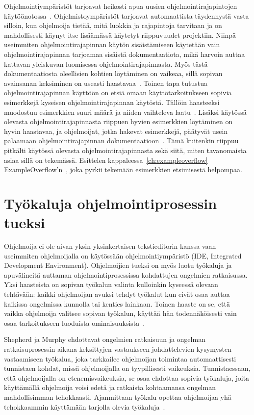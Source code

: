 \documentclass[finnish]{tktltiki2}
\theoremstyle{definition}
\theoremstyle{remark}
\begin{document}
Ohjelmointiympäristöt tarjoavat heikosti apua uusien ohjelmointirajapintojen käytöönotossa~\cite{jungloid-mining}. Ohjelmistoympäristöt tarjoavat automaattista täydennystä vasta silloin, kun ohjelmoija tietää, mitä luokkia ja rajapintoja tarvitaan ja on mahdollisesti käynyt itse lisäämässä käytetyt riippuvuudet projektiin. Niinpä useimmiten ohjelmointirajapinnan käytön sisäistämiseen käytetään vain ohjelmointirajapinnan tarjoamaa sisäistä dokumentaatiota, mikä harvoin auttaa kattavan yleiskuvan luomisessa ohjelmointirajapinnasta. Myös tästä dokumentaatiosta oleellisien kohtien löytäminen on vaikeaa, sillä sopivan avainsanan keksiminen on useasti haastavaa~\cite{what-to-search-for}.
Toinen tapa tutustua ohjelmointirajapinnan käyttöön on etsiä omaan käyttötarkoitukseen sopivia esimerkkejä kyseisen ohjelmointirajapinnan käytöstä. Tällöin haasteeksi muodostuu esimerkkien suuri määrä ja niiden vaihteleva laatu~\cite{example-overflow-social-media-for-code-recommendations}. Lisäksi käytössä olevasta ohjelmointirajapinnasta riippuen hyvien esimerkkien löytäminen on hyvin haastavaa, ja ohjelmoijat, jotka hakevat esimerkkejä, päätyvät usein palaamaan ohjelmointirajapinnan dokumentaatioon~\cite{asking-and-answering-api-questions}. Tämä kuitenkin riippuu pitkälti käytössä olevasta ohjelmointirajapinnasta sekä siitä, miten tavanomaista asiaa sillä on tekemässä. Esittelen kappaleessa~\ref{ch:exampleoverflow} ExampleOverflow'n~\cite{example-overflow-social-media-for-code-recommendations}, joka pyrkii tekemään esimerkkien etsimisestä helpompaa.

\section{Työkaluja ohjelmointiprosessin tueksi}
Ohjelmoija ei ole aivan yksin yksinkertaisen tekstieditorin kanssa vaan useimmiten ohjelmoijalla on käytössään ohjelmointiympäristö (IDE, Integrated Development Environment). Ohjelmoijien tueksi on myös luotu työkaluja ja apuvälineitä auttaman ohjelmointiprosessissa kohdattujen ongelmien ratkaisussa.
Yksi haasteista on sopivan työkalun valinta kulloinkin kyseessä olevaan tehtävään: kaikki ohjelmoijan avuksi tehdyt työkalut kun eivät osaa auttaa kaikissa ongelmissa kunnolla tai kenties lainkaan. Toinen haaste on se, että vaikka ohjelmoija valitsee sopivan työkalun, käyttää hän todennäköisesti vain osaa tarkoitukseen luoduista ominaisuuksista~\cite{whyline}.

Shepherd ja Murphy ehdottavat ongelmien ratkaisuun ja ongelman ratkaisuprosessin aikana keksittyjen vastaukseen johdattelevien kysymysten vastaamiseen työkalua, joka tarkkailee ohjelmoijan toimintaa automaattisesti tunnistaen kohdat, missä ohjelmoijalla on tyypillisesti vaikeuksia. Tunnistaessaan, että ohjelmoijalla on etenemisvaikeuksia,
se osaa ehdottaa sopivia työkaluja, joita käyttämällä ohjelmoija voisi edetä ja ratkaista kohtaamansa ongelman mahdollisimman tehokkaasti. Ajanmittaan työkalu opettaa ohjelmoijaa yhä tehokkaammin käyttämään tarjolla olevia työkaluja~\cite{programmers-coach}.
\end{document}
